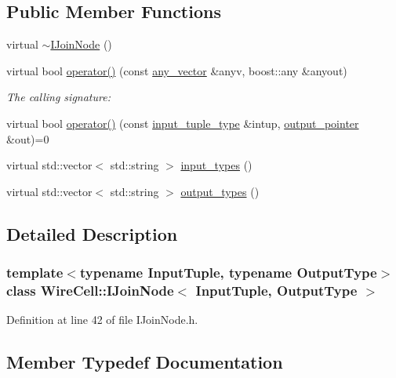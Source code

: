 \subsection*{Public Member Functions}
\begin{DoxyCompactItemize}
\item 
virtual \hyperlink{class_wire_cell_1_1_i_join_node_abc2bb6894c26c1a7bf6eac433a2fa25b}{$\sim$\+I\+Join\+Node} ()
\item 
virtual bool \hyperlink{class_wire_cell_1_1_i_join_node_ab807b2f2f3abbfedc1c1292f8a9cd617}{operator()} (const \hyperlink{class_wire_cell_1_1_i_join_node_base_a5d53e0f00c30b472677c399c7d358fa3}{any\+\_\+vector} \&anyv, boost\+::any \&anyout)
\begin{DoxyCompactList}\small\item\em The calling signature\+: \end{DoxyCompactList}\item 
virtual bool \hyperlink{class_wire_cell_1_1_i_join_node_aef2cc0875f30a08b19b0478c48c190cc}{operator()} (const \hyperlink{class_wire_cell_1_1_i_join_node_ae9ca74a75f29555ad20944d585f3b232}{input\+\_\+tuple\+\_\+type} \&intup, \hyperlink{class_wire_cell_1_1_i_join_node_a7af33cc87415e15f0e7db2b083f3def7}{output\+\_\+pointer} \&out)=0
\item 
virtual std\+::vector$<$ std\+::string $>$ \hyperlink{class_wire_cell_1_1_i_join_node_a2a9b72881831998cb7c66825f2101abb}{input\+\_\+types} ()
\item 
virtual std\+::vector$<$ std\+::string $>$ \hyperlink{class_wire_cell_1_1_i_join_node_abd32af32f2ed933356b4b3b7591cded3}{output\+\_\+types} ()
\end{DoxyCompactItemize}


\subsection{Detailed Description}
\subsubsection*{template$<$typename Input\+Tuple, typename Output\+Type$>$\newline
class Wire\+Cell\+::\+I\+Join\+Node$<$ Input\+Tuple, Output\+Type $>$}



Definition at line 42 of file I\+Join\+Node.\+h.



\subsection{Member Typedef Documentation}
\mbox{\label{class_wire_cell_1_1_i_join_node_ab2bee25205e04b7620344e5fccd27180}} 
